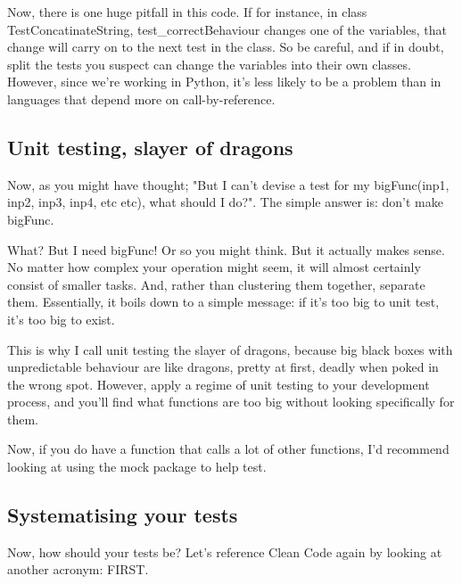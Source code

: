 \documentclass[10pt,a4paper]{article}
\begin{document}
Now, there is one huge pitfall in this code. If for instance, in class TestConcatinateString, test\_correctBehaviour changes one of the variables, that change will carry on to the next test in the class. So be careful, and if in doubt, split the tests you suspect can change the variables into their own classes. However, since we're working in Python, it's less likely to be a problem than in languages that depend more on call-by-reference.  


\subsection{Unit testing, slayer of dragons}
Now, as you might have thought; "But I can't devise a test for my bigFunc(inp1, inp2, inp3, inp4, etc etc), what should I do?". The simple answer is: don't make bigFunc.

What? But I need bigFunc! Or so you might think. But it actually makes sense. No matter how complex your operation might seem, it will almost certainly consist of smaller tasks. And, rather than clustering them together, separate them. Essentially, it boils down to a simple message: if it's too big to unit test, it's too big to exist.

This is why I call unit testing the slayer of dragons, because big black boxes with unpredictable behaviour are like dragons, pretty at first, deadly when poked in the wrong spot. However, apply a regime of unit testing to your development process, and you'll find what functions are too big without looking specifically for them.

Now, if you do have a function that calls a lot of other functions, I'd recommend looking at using the mock package to help test. 

\subsection{Systematising your tests}

Now, how should your tests be? Let's reference Clean Code again by looking at another acronym: FIRST.
\end{document}
